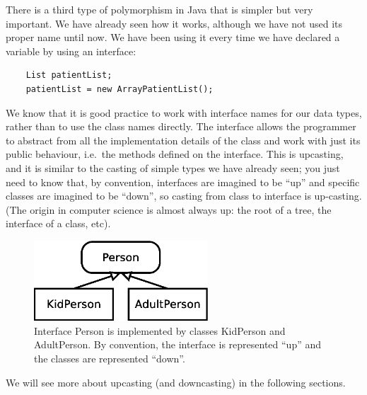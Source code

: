 There is a third type of
polymorphism in Java that is simpler but very important. We have
already seen how it works, although we have not used its proper name
until now.
We have been using it every time we have declared
a variable by using an interface: 

\begin{verbatim}
    List patientList;
    patientList = new ArrayPatientList();
\end{verbatim}

We know that it is good practice to work with interface names for our
data types, rather than to use the class names directly. The interface
allows the programmer to abstract from all the implementation details
of the class and work with just its public behaviour, i.e.~the methods
defined on the interface. This is upcasting, and it is similar to the
casting of simple types we have already seen; you just need to know
that, by convention, interfaces are imagined to be ``up'' and specific
classes are imagined to be ``down'', so casting from class to
interface is up-casting. (The origin in computer science is almost
always up: the root of a tree, the interface of a class, etc). 

\begin{figure}[hbtp]
  \centering
  \includegraphics[height=3cm]{gfx/class_diagram-person}
  \caption{Interface Person is implemented by classes KidPerson and
    AdultPerson. By convention, the interface is represented ``up'' and
    the classes are represented ``down''.} 
  \label{fig:updown}
\end{figure}

We will see more about upcasting (and downcasting) in the following
sections. 



